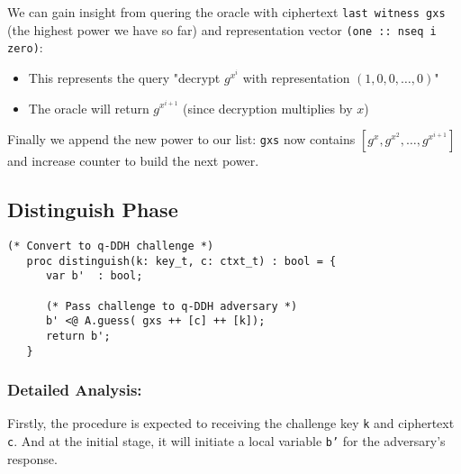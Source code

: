 We can gain insight from quering the oracle with ciphertext \texttt{last witness gxs} (the highest power we have so far) and representation vector \texttt{(one :: nseq i zero)}:
  \begin{itemize}
  \item This represents the query "decrypt $g^{x^i}$ with representation $(1, 0, 0, \ldots, 0)$"
  \item The oracle will return $g^{x^{i+1}}$ (since decryption multiplies by $x$)
  \end{itemize}

Finally we append the new power to our list: \texttt{gxs} now contains $[g^x, g^{x^2}, \ldots, g^{x^{i+1}}]$ and increase counter to build the next power.


\subsection{Distinguish Phase}

\begin{lstlisting}[style=easycrypt, caption=B\_from\_qDDH Distinguish Phase, breaklines=true, breakatwhitespace=true, frame=single, keepspaces=true]
  (* Convert to q-DDH challenge *)
   proc distinguish(k: key_t, c: ctxt_t) : bool = {
      var b'  : bool;
      
      (* Pass challenge to q-DDH adversary *)
      b' <@ A.guess( gxs ++ [c] ++ [k]);
      return b';
   }
\end{lstlisting}

\subsubsection{Detailed Analysis:}
Firstly, the procedure is expected to receiving the challenge key \texttt{k} and ciphertext \texttt{c}. And at the initial stage, it will initiate a local variable \texttt{b'} for the adversary's response.

